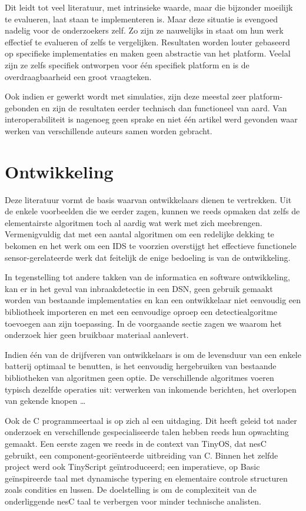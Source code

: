 Dit leidt tot veel literatuur, met intrinsieke waarde, maar die bijzonder
moeilijk te evalueren, laat staan te implementeren is. Maar deze situatie is
evengoed nadelig voor de onderzoekers zelf. Zo zijn ze nauwelijks in staat om
hun werk effectief te evalueren of zelfs te vergelijken. Resultaten worden
louter gebaseerd op specifieke implementaties en maken geen abstractie van het
platform. Veelal zijn ze zelfs specifiek ontworpen voor \'e\'en specifiek
platform en is de overdraagbaarheid een groot vraagteken.

Ook indien er gewerkt wordt met simulaties, zijn deze meestal zeer
platform-gebonden en zijn de resultaten eerder technisch dan functioneel van
aard. Van interoperabiliteit is nagenoeg geen sprake en niet \'e\'en artikel
werd gevonden waar werken van verschillende auteurs samen worden gebracht.

\section{Ontwikkeling}
\label{section:problem-develop}

Deze literatuur vormt de basis waarvan ontwikkelaars dienen te vertrekken. Uit
de enkele voorbeelden die we eerder zagen, kunnen we reeds opmaken dat zelfs de
elementairste algoritmen toch al aardig wat werk met zich meebrengen.
Vermenigvuldig dat met een aantal algoritmen om een redelijke dekking te
bekomen en het werk om een IDS te voorzien overstijgt het effectieve
functionele sensor-gerelateerde werk dat feitelijk de enige bedoeling is van de
ontwikkeling.

In tegenstelling tot andere takken van de informatica en software ontwikkeling,
kan er in het geval van inbraakdetectie in een DSN, geen gebruik gemaakt worden
van bestaande implementaties en kan een ontwikkelaar niet eenvoudig een
bibliotheek importeren en met een eenvoudige oproep een detectiealgoritme
toevoegen aan zijn toepassing. In de voorgaande sectie zagen we waarom het
onderzoek hier geen bruikbaar materiaal aanlevert.

Indien \'e\'en van de drijfveren van ontwikkelaars is om de levensduur van een
enkele batterij optimaal te benutten, is het eenvoudig hergebruiken van
bestaande bibliotheken van algoritmen geen optie. De verschillende algoritmes
voeren typisch dezelfde operaties uit: verwerken van inkomende berichten, het
overlopen van gekende knopen \dots

Ook de C programmeertaal is op zich al een uitdaging. Dit heeft geleid tot
nader onderzoek en verschillende gespecialiseerde talen hebben reeds hun
opwachting gemaakt. Een eerste zagen we reeds in de context van TinyOS, dat
nesC \citep{gay2003nesc} gebruikt, een component-geori\"enteerde uitbreiding
van C. Binnen het zelfde project werd ook TinyScript
\citep{levis2004tinyscript} ge\"introduceerd; een imperatieve, op Basic
ge\"inspireerde taal met dynamische typering en elementaire controle structuren
zoals condities en lussen. De doelstelling is om de complexiteit van de
onderliggende nesC taal te verbergen voor minder technische analisten.

